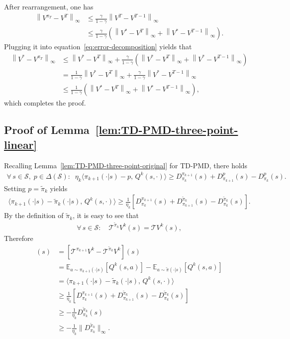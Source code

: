 \documentclass[10pt]{article}
\newcommand{\calS}{\mathcal{S}}
\newcommand{\calT}{\mathcal{T}}
\newcommand{\E}{\mathbb{E}}
\newcommand{\ls}{\left}
\newcommand{\rs}{\right}
\theoremstyle{plain}
\theoremstyle{definition}
\begin{document}
After rearrangement, one has
\begin{align*}
    \ls\| V^{\pi_T} - V^T \rs\|_\infty &\leq \frac{\gamma}{1-\gamma} \ls\| V^T - V^{T-1} \rs\|_\infty \\
    &\leq \frac{\gamma}{1-\gamma} \ls( \ls\| V^* - V^{T} \rs\|_\infty + \ls\| V^* - V^{T-1} \rs\|_\infty \rs).
\end{align*}
Plugging it into equation~\eqref{eq:error-decomposition} yields that
\begin{align*}
    \ls\| V^* - V^{\pi_T} \rs\|_\infty &\leq \ls\| V^* - V^T \rs\|_\infty + \frac{\gamma}{1-\gamma} \ls( \ls\| V^* - V^{T} \rs\|_\infty + \ls\| V^* - V^{T-1} \rs\|_\infty \rs) \\
    &= \frac{1}{1-\gamma} \ls\| V^* - V^{T} \rs\|_\infty + \frac{\gamma}{1-\gamma} \ls\| V^* - V^{T-1} \rs\|_\infty \\
    &\leq \frac{1}{1-\gamma} \ls( \ls\| V^* - V^T \rs\|_\infty + \ls\| V^* - V^{T-1} \rs\|_\infty \rs),
\end{align*}
which completes the proof.

\subsection{Proof of Lemma~\ref{lem:TD-PMD-three-point-linear}}
\label{sec:pf:lem:TD-PMD-three-point-linear}
Recalling Lemma~\ref{lem:TD-PMD-three-point-original}  for TD-PMD, there holds
\begin{align*}
    \forall\, s\in\calS,\; p\in\Delta(\calS): \;\; \eta_k \langle \pi_{k+1}(\cdot|s) - p, \, Q^k(s,\cdot) \rangle \geq D^{\pi_{k+1}}_{\pi_k}(s) + D^p_{\pi_{k+1}}(s) - D^p_{\pi_k}(s).
\end{align*}
Setting $p=\tilde{\pi}_k$ yields
\begin{align*}
        \langle \pi_{k+1}(\cdot|s) - \tilde{\pi}_k(\cdot|s), \, {Q}^k(s,\cdot) \rangle \geq \frac{1}{\eta_k}[D^{\pi_{k+1}}_{\pi_k}(s) + D^{\tilde{\pi}_k}_{\pi_{k+1}}(s) - D^{\tilde{\pi}_k}_{\pi_k}(s)].
\end{align*}
By the definition of $\tilde{\pi}_k$, it is easy to see that
\begin{align*}
    \forall\, s\in\calS: \quad \calT^{\tilde{\pi}_k} V^k(s) = \calT V^k(s),
\end{align*}
Therefore
\begin{align*}
    [\calT^{\pi_{k+1}} V^k - \calT V^k](s) &= [\calT^{\pi_{k+1}} V^k - \calT^{\tilde{\pi}_k}V^k](s) \\
    &= \E_{a\sim\pi_{k+1}(\cdot|s)} [Q^k(s,a)] - \E_{a\sim\tilde{\pi}(\cdot|s)}[Q^k(s,a)] \\
    &= \langle \pi_{k+1}(\cdot|s) - \tilde{\pi}_k(\cdot|s), \, {Q}^k(s,\cdot) \rangle \\
    &\geq \frac{1}{\eta_k}[D^{\pi_{k+1}}_{\pi_k}(s) + D^{\tilde{\pi}_k}_{\pi_{k+1}}(s) - D^{\tilde{\pi}_k}_{\pi_k}(s)] \\
    &\geq -\frac{1}{\eta_k} D^{\tilde{\pi}_k}_{\pi_k}(s)\\
    &\geq -\frac{1}{\eta_k} \| D_{\pi_k}^{\tilde{\pi}_k} \|_\infty.
\end{align*}
\end{document}
